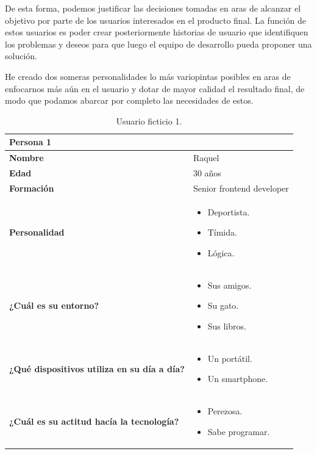De esta forma, podemos justificar las decisiones tomadas en aras de alcanzar el objetivo
por parte de los usuarios interesados en el producto final. La función de estos usuarios
es poder crear posteriormente historias de usuario que identifiquen los problemas y
deseos para que luego el equipo de desarrollo pueda proponer una solución.

He creado dos someras personalidades lo más variopintas posibles en aras de enfocarnos más
aún en el usuario y dotar de mayor calidad el resultado final, de modo que podamos abarcar
por completo las necesidades de estos.

\begin{table}[H]
   \begin{center}
      \begin{tabular}{| p{} | p{} |}
         \hline
         Persona 1 &  \\ \hline
         \textbf{Nombre} & Raquel \\
         \textbf{Edad} & 30 años \\
         \textbf{Formación} & Senior frontend developer \\
         \textbf{Personalidad} & \begin{itemize}
                \item Deportista.
                \item Tímida.
                \item Lógica. \end{itemize} \\
         \textbf{¿Cuál es su entorno?} & \begin{itemize}
                \item Sus amigos.
                \item Su gato.
                \item Sus libros. \end{itemize} \\
         \textbf{¿Qué dispositivos utiliza en su día a día?} & \begin{itemize}
                \item Un portátil.
                \item Un smartphone. \end{itemize} \\
            \textbf{¿Cuál es su actitud hacía la tecnología?} & \begin{itemize}
                \item Perezosa.
                \item Sabe programar. \end{itemize} \\
            \hline
      \end{tabular}
      \caption{Usuario ficticio 1.}
   \end{center}
\end{table}

